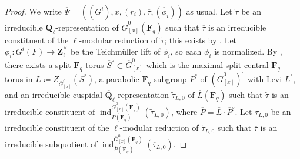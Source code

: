 \documentclass[reqno]{amsart}
\numberwithin{equation}{subsection}
\newcommand{\F}{\mathbf{F}}
\newcommand{\wt}[1]{\widetilde{#1}}
\newcommand{\Q}{\mathbf{Q}}
\newcommand{\Z}{\mathbf{Z}}
\newcommand{\ol}[1]{\overline{#1}}
\newcommand{\co}{\colon}
\DeclareMathOperator{\ind}{ind}
\theoremstyle{remark}
\numberwithin{equation}{subsection}
\numberwithin{figure}{subsection}
\begin{document}
\begin{proof}
We write $\ol\Psi = ((G^i), x, (r_i), \ol\tau, (\ol\phi_i))$ as usual. Let $\wt\tau$ be an irreducible $\ol\Q_\ell$-representation of $\ol G^0_{[x]}(\F_q)$ such that $\ol\tau$ is an irreducible constituent of the $\ell$-modular reduction of $\wt\tau$; this exists by \cite[Part III, no.\ 16.1, Theorem 33]{Serre77}. Let $\phi_i\co G^i(F)\to\ol\Z_\ell^\times$ be the Teichm\"uller lift of $\ol\phi_i$, so each $\phi_i$ is normalized. By \cite[Lemma~2.10.2]{Cot26b}, there exists a split $\F_q$-torus $\ol S^\circ \subset \ol G^0_{[x]}$ which is the maximal split central $\F_q$-torus in $\ol L \coloneqq Z_{\ol G^0_{[x]}}(\ol S^\circ)$, a parabolic $\F_q$-subgroup $\ol P^\circ$ of $(\ol G^0_{[x]})^\circ$ with Levi $\ol L^\circ$, and an irreducible cuspidal $\ol\Q_\ell$-representation $\wt\tau_{L,0}$ of $\ol L(\F_q)$ such that $\wt\tau$ is an irreducible constituent of $\ind_{\ol P(\F_q)}^{\ol G^0_{[x]}(\F_q)}(\wt\tau_{L,0})$, where $\ol P = \ol L \cdot \ol P^\circ$. Let $\ol\tau_{L,0}$ be an irreducible constituent of the $\ell$-modular reduction of $\wt\tau_{L,0}$ such that $\ol\tau$ is an irreducible subquotient of $\ind_{\ol P(\F_q)}^{\ol G^0_{[x]}(\F_q)}(\ol\tau_{L,0})$.


\end{proof}
\end{document}
